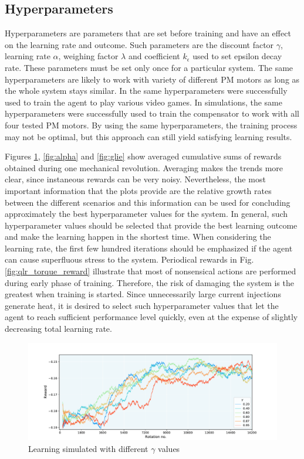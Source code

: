 \subsection{Hyperparameters} \label{hyperparameters}
Hyperparameters are parameters that are set before training and have an effect on the learning rate and outcome. Such parameters are the discount factor $\gamma$, learning rate $\alpha$, weighing factor $\lambda$ and coefficient $k_\epsilon$ used to set epsilon decay rate. These parameters must be set only once for a particular system. The same hyperparameters are likely to work with variety of different PM motors as long as the whole system stays similar. In \cite{RL:atari} the same hyperparameters were successfully used to train the agent to play various video games. In simulations, the same hyperparameters were successfully used to train the compensator to work with all four tested PM motors. By using the same hyperparameters, the training process may not be optimal, but this approach can still yield satisfying learning results.

Figures \ref{fig:gamma}, \ref{fig:alpha} and \ref{fig:glie} show averaged cumulative sums of rewards obtained during one mechanical revolution. Averaging makes the trends more clear, since instaneous rewards can be very noisy. Nevertheless, the most important information that the plots provide are the relative growth rates between the different scenarios and this information can be used for concluding approximately the best hyperparameter values for the system. In general, such hyperparameter values should be selected that provide the best learning outcome and make the learning happen in the shortest time. When considering the learning rate, the first few hundred iterations should be emphasized if the agent can cause superfluous stress to the system. Periodical rewards in Fig. \ref{fig:qlr_torque_reward} illustrate that most of nonsensical actions are performed during early phase of training. Therefore, the risk of damaging the system is the greatest when training is started. Since unnecessarily large current injections generate heat, it is desired to select such hyperparameter values that let the agent to reach sufficient performance level quickly, even at the expense of slightly decreasing total learning rate.
\begin{figure}[htb] 
    \centering
    \includegraphics[width=\textwidth]{images/Qgamma_wide.pdf}
    \caption{\small Learning simulated with different $\gamma$ values}
    \label{fig:gamma}
\end{figure}

